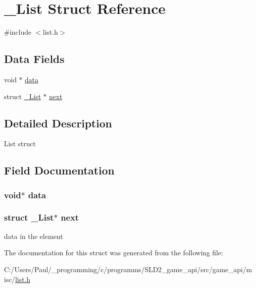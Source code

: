 \hypertarget{struct___list}{\section{\+\_\+\+List Struct Reference}
\label{struct___list}
}


{\ttfamily \#include $<$list.\+h$>$}

\subsection*{Data Fields}
\begin{DoxyCompactItemize}
\item 
void $\ast$ \hyperlink{struct___list_a735984d41155bc1032e09bece8f8d66d}{data}
\item 
struct \hyperlink{struct___list}{\+\_\+\+List} $\ast$ \hyperlink{struct___list_a81debf80d483b20cf92dc02b1e43c3a4}{next}
\end{DoxyCompactItemize}


\subsection{Detailed Description}
List struct 

\subsection{Field Documentation}
\hypertarget{struct___list_a735984d41155bc1032e09bece8f8d66d}{
\subsubsection[{data}]{\setlength{\rightskip}{0pt plus 5cm}void$\ast$ data}}\label{struct___list_a735984d41155bc1032e09bece8f8d66d}
\hypertarget{struct___list_a81debf80d483b20cf92dc02b1e43c3a4}{
\subsubsection[{next}]{\setlength{\rightskip}{0pt plus 5cm}struct {\bf \+\_\+\+List}$\ast$ next}}\label{struct___list_a81debf80d483b20cf92dc02b1e43c3a4}
data in the element 

The documentation for this struct was generated from the following file\+:\begin{DoxyCompactItemize}
\item 
C\+:/\+Users/\+Paul/\+\_\+programming/c/programms/\+S\+L\+D2\+\_\+game\+\_\+api/src/game\+\_\+api/misc/\hyperlink{list_8h}{list.\+h}\end{DoxyCompactItemize}
